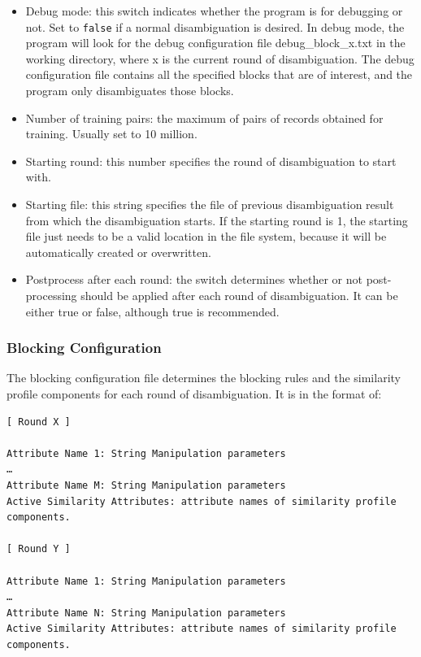 \documentclass{article}
\begin{document}
\begin{itemize}
\item Debug mode: this switch indicates whether the program is 
for debugging or not. Set to \texttt{false} if a normal 
disambiguation is desired. In debug mode, the program will 
look for the debug configuration file debug\_block\_x.txt 
in the working directory, where x is the current round
of disambiguation. The debug configuration file contains all 
the specified blocks that are of interest, and the program only 
disambiguates those blocks.

\item Number of training pairs: the maximum of pairs of records 
obtained for training. Usually set to 10 million.

\item Starting round: this number specifies the round of 
disambiguation to start with.

\item Starting file: this string specifies the file of previous 
disambiguation result from which the disambiguation starts. If the
starting round is 1, the starting file just needs to be a valid
location in the file system, because it will be automatically 
created or overwritten.


\item Postprocess after each round: the switch determines whether 
or not post-processing should be applied after each round of 
disambiguation. It can be either true or false,
although true is recommended.

\end{itemize}

\subsubsection{Blocking Configuration}


The blocking configuration file determines the blocking 
rules and the similarity profile components
for each round of disambiguation. It is in the format of:

\begin{verbatim}
[ Round X ]

Attribute Name 1: String Manipulation parameters
…
Attribute Name M: String Manipulation parameters
Active Similarity Attributes: attribute names of similarity profile components.

[ Round Y ]

Attribute Name 1: String Manipulation parameters
…
Attribute Name N: String Manipulation parameters
Active Similarity Attributes: attribute names of similarity profile components.
\end{verbatim}
\end{document}

